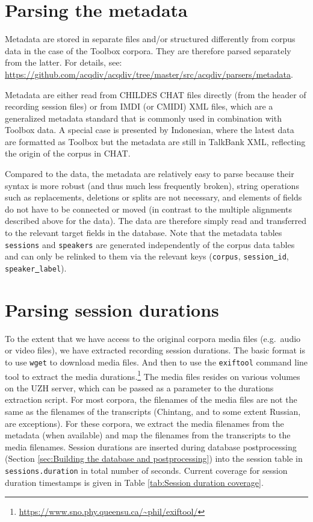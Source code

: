 \documentclass[a4paper, 11pt]{book}
\newcommand{\und}{\underline{{ }}\hspace{0.2mm}}	%
\begin{document}
\section{Parsing the metadata}
\label{sec:Parsing the metadata}

Metadata are stored in separate files and/or structured differently from corpus data in the case of the Toolbox corpora. They are therefore parsed separately from the latter. For details, see: \url{https://github.com/acqdiv/acqdiv/tree/master/src/acqdiv/parsers/metadata}.

Metadata are either read from CHILDES CHAT files directly (from the header of recording session files) or from IMDI (or CMIDI) XML files, which are a generalized metadata standard that is commonly used in combination with Toolbox data. A special case is presented by Indonesian, where the latest data are formatted as Toolbox but the metadata are still in TalkBank XML, reflecting the origin of the corpus in CHAT. 

Compared to the data, the metadata are relatively easy to parse because their syntax is more robust (and thus much less frequently broken), string operations such as replacements, deletions or splits are not necessary, and elements of fields do not have to be connected or moved (in contrast to the multiple alignments described above for the data). The data are therefore simply read and transferred to the relevant target fields in the database. Note that the metadata tables \texttt{sessions} and \texttt{speakers} are generated independently of the corpus data tables and can only be relinked to them via the relevant keys (\texttt{corpus}, \texttt{session\und id}, \texttt{speaker\und label}). 


\section{Parsing session durations}
\label{sec:Parsing session durations}


To the extent that we have access to the original corpora media files (e.g.\ audio or video files), we have extracted recording session durations. The basic format is to use \texttt{wget} to download media files. And then to use the \texttt{exiftool} command line tool to extract the media durations.\footnote{\url{https://www.sno.phy.queensu.ca/~phil/exiftool/}} The media files resides on various volumes on the UZH server, which can be passed as a parameter to the durations extraction script. For most corpora, the filenames of the media files are not the same as the filenames of the transcripts (Chintang, and to some extent Russian, are exceptions). For these corpora, we extract the media filenames from the metadata (when available) and map the filenames from the transcripts to the media filenames. Session durations are inserted during database postprocessing (Section \ref{sec:Building the database and postprocessing}) into the session table in \texttt{sessions.duration} in total number of seconds. Current coverage for session duration timestamps is given in Table \ref{tab:Session duration coverage}.
\end{document}
